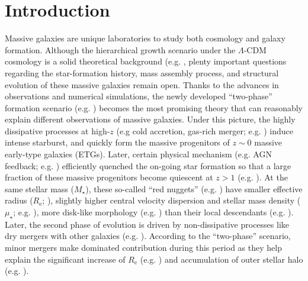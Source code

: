 \documentclass[a4paper,fleqn,usenatbib]{mnras}
\def\mstar{{$M_{\star}$}}
\def\mden{{$\mu_{\star}$}}
\begin{document}
\section{Introduction}
    \label{sec:intro}

    Massive galaxies are unique laboratories to study both cosmology and galaxy 
    formation. 
    Although the hierarchical growth scenario under the $\Lambda$-CDM cosmology 
    is a solid theoretical background (e.g. \citealt{Baugh1996, DeLucia2006}, 
    plenty important questions regarding the star-formation history, mass assembly 
    process, and structural evolution of these massive galaxies remain open. 
    Thanks to the advances in observations and numerical simulations, the newly 
    developed ``two-phase'' formation scenario (e.g. \citealt{Oser2010, Oser2012}) 
    becomes the most promising theory that can reasonably explain different 
    observations of massive galaxies. 
    Under this picture, the highly dissipative processes at high-$z$ (e.g cold 
    accretion, gas-rich merger; e.g. \citealt{Hopkins2008, Dekel2009}) induce 
    intense starburst, and quickly form the massive progenitors of $z\sim 0$ massive 
    early-type galaxies (ETGs).     
    Later, certain physical mechanism (e.g. AGN feedback; e.g. \citealt{Sijacki2007,
    Fabian2012}) 
    efficiently quenched the on-going star formation so that a large fraction of 
    these massive progenitors become quiescent at $z>1$ (e.g. \citealt{Bezanson2009,
    Kriek2016}). 
    At the same stellar mass (\mstar{}), these so-called ``red nuggets'' 
    (e.g. \citealt{Damjanov2009}) have smaller effective radius 
    ($R_{\mathrm{e}}$; \citealt{Trujillo2006, vanDokkum2008, Cimatti2008}), 
    slightly higher central velocity dispersion and stellar mass density 
    (\mden{}; e.g. \citealt{vandeSande2011, Belli2014}), more disk-like morphology 
    (e.g. \citealt{vanderWel2011}) than their local descendants 
    (e.g. \citealt{Bezanson2009, vanDokkum2010}). 
    Later, the second phase of evolution is driven by non-dissipative processes 
    like dry mergers with other galaxies (e.g. \citealt{Naab2006, Khochfar2006}). 
    According to the ``two-phase'' scenario, minor mergers make dominated 
    contribution during this period as they help explain the significant increase
    of $R_{\mathrm{e}}$ (e.g. \citealt{Newman2012, vdWel2014}) and accumulation of 
    outer stellar halo (e.g.  \citealt{Szomoru2012, Patel2013}).         
   
\end{document}
